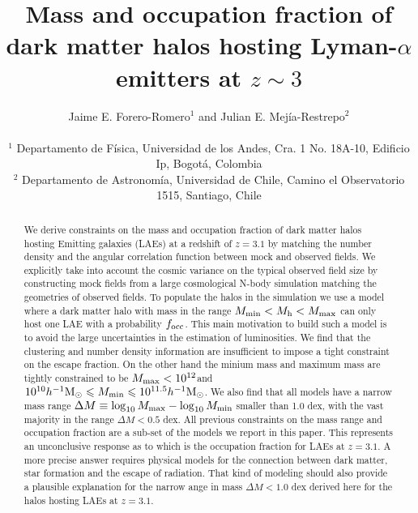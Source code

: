 \documentclass[usenatbib]{mn2e}
\newcommand{\ly}{{\ifmmode{{\rm Ly}\alpha}\else{Ly$\alpha$~}\fi}}
\newcommand{\hMsun}{{\ifmmode{h^{-1}{\rm
        {M_{\odot}}}}\else{$h^{-1}{\rm{M_{\odot}}}$}\fi}}
\begin{document}
\title[Halo mass and occupation fraction for LAEs at
  $z=3.1$]{Mass and occupation
  fraction of dark matter halos hosting Lyman-$\alpha$ emitters
  at $z\sim 3$}    
\author[~J.~E. Forero-Romero and ~J.~E Mejia-Restreo]{
\parbox[t]{\textwidth}{\raggedright 
  Jaime E. Forero-Romero$^{1}$ and
  Julian E. Mej\'ia-Restrepo$^{2}$ 
}
\vspace*{6pt}\\
$^{1}$ Departamento de F\'{i}sica, Universidad de los Andes, Cra. 1
No. 18A-10, Edificio Ip, Bogot\'a, Colombia \\
$^{2}$ Departamento de Astronom\'{i}a, Universidad de Chile, Camino el
Observatorio 1515, Santiago, Chile} 

\maketitle

\begin{abstract}
%
We derive constraints on the mass and occupation fraction of dark
matter halos hosting \ly Emitting galaxies (LAEs) at a redshift of
$z=3.1$ by matching the number density and the angular
correlation function between mock and observed fields. We explicitly
take into account the cosmic variance on the typical observed field size by
constructing mock fields from a large cosmological N-body
simulation matching the geometries of observed fields. To populate the
halos in the simulation we use a model where a dark matter halo with
mass in the range $M_{\rm   min}<M_{\rm h}<M_{\rm max}$ can only host
one LAE with a probability $f_{\rm occ}$. This main motivation to
build such a model is to avoid the large uncertainties in the estimation of
\ly luminosities. We find that the clustering and number density information are
insufficient to impose a tight constraint on the escape fraction. On
the other hand the minium mass and maximum mass are tightly
constrained to be $M_{\rm max}<10^{12}$\hMsun and
$10^{10}\hMsun\leq M_{\rm min}\leq 10^{11.5}\hMsun$.  We also find
that all models have a narrow mass range $\Delta M \equiv
\log_{10}M_{\rm max} - \log_{10} M_{\rm min}$ smaller than 1.0 dex,
with the vast majority in the range $\Delta M<0.5$ dex. All previous
constraints on the mass range and occupation fraction are a sub-set of
the models we report in this paper. This represents an unconclusive response as
to which is the occupation fraction for LAEs at $z=3.1$. A more
precise answer requires physical models for the connection between
dark matter, star formation and the escape of \ly radiation. That kind
of modeling should also provide a plausible explanation for the narrow
 ange in mass $\Delta M<1.0$ dex derived here for the halos hosting
 LAEs at $z=3.1$.   

\end{abstract}
\end{document}
